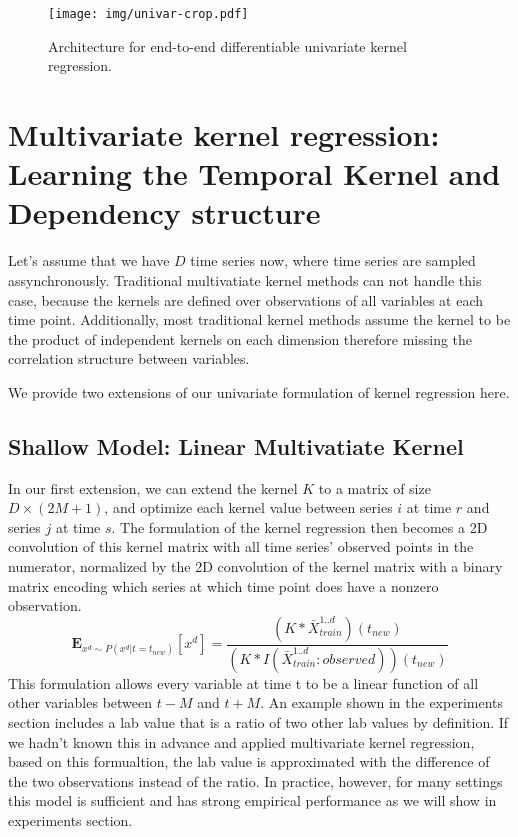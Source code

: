 \documentclass{article} %
\begin{document}
\begin{figure}[h]
\begin{center}
\texttt{[image: img/univar-crop.pdf]}
\end{center}
\caption{Architecture for end-to-end differentiable univariate kernel regression.}\label{fig:arch}
\end{figure}

\section{Multivariate kernel regression: Learning the Temporal Kernel and Dependency structure}

Let's assume that we have $D$ time series now, where time series are sampled assynchronously. Traditional multivatiate kernel methods can not handle this case, because the kernels are defined over observations of all variables at each time point. Additionally, most traditional kernel methods assume the kernel to be the product of independent kernels on each dimension therefore missing the correlation structure between variables.

We provide two extensions of our univariate formulation of kernel regression here. 

\subsection{Shallow Model: Linear Multivatiate Kernel}
In our first extension, we can extend the kernel $K$ to a matrix of size $D \times (2M+1)$, and optimize each kernel value between series $i$ at time $r$ and series $j$ at time $s$. The formulation of the kernel regression then becomes a 2D convolution of this kernel matrix with all time series' observed points in the numerator, normalized by the 2D convolution of the kernel matrix with a binary matrix encoding which series at which time point does have a nonzero observation. 
% 
$$ \mathbf{E}_{x^d \sim P(x^d|t=t_{new})}[x^d] = \frac{(K \ast \bar X^{1..d}_{train})(t_{new})}{(K \ast I(\bar X^{1..d}_{train} :observed)) (t_{new})} $$
% 
This formulation allows every variable at time t to be a linear function of all other variables between $t-M$ and $t+M$. An example shown in the experiments section includes a lab value that is a ratio of two other lab values by definition. If we hadn't known this in advance and applied multivariate kernel regression, based on this formualtion, the lab value is approximated with the difference of the two observations instead of the ratio. In practice, however, for many settings this model is sufficient and has strong empirical performance as we will show in experiments section.
\end{document}
